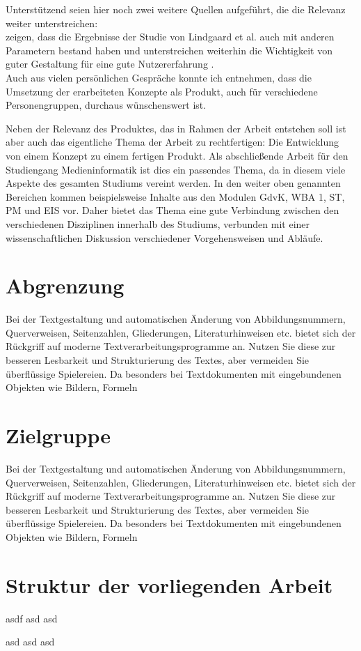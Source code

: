 Unterstützend seien hier noch zwei weitere Quellen aufgeführt, die die Relevanz weiter unterstreichen:\\
\cite{tractinsky2006evaluating} zeigen, dass die Ergebnisse der Studie von Lindgaard et al. auch mit anderen Parametern bestand haben und unterstreichen weiterhin die Wichtigkeit von guter Gestaltung für eine gute Nutzererfahrung \cite{tractinsky2000beautiful}.\\
Auch aus vielen persönlichen Gespräche konnte ich entnehmen, dass die Umsetzung der erarbeiteten Konzepte als Produkt, auch für verschiedene Personengruppen, durchaus wünschenswert ist.

Neben der Relevanz des Produktes, das in Rahmen der Arbeit entstehen soll ist aber auch das eigentliche Thema der Arbeit zu rechtfertigen: Die Entwicklung von einem Konzept zu einem fertigen Produkt.
Als abschließende Arbeit für den Studiengang Medieninformatik ist dies ein passendes Thema, da in diesem viele Aspekte des gesamten Studiums vereint werden. In den weiter oben genannten Bereichen kommen beispielsweise Inhalte aus den Modulen GdvK, WBA 1, ST,  PM und EIS vor. Daher bietet das Thema eine gute Verbindung zwischen den verschiedenen Disziplinen innerhalb des Studiums, verbunden mit einer wissenschaftlichen Diskussion verschiedener Vorgehensweisen und Abläufe.

\section{Abgrenzung}
Bei der Textgestaltung und automatischen Änderung von Abbildungsnummern, Querverweisen,
Seitenzahlen, Gliederungen, Literaturhinweisen etc. bietet sich der Rückgriff
auf moderne Textverarbeitungsprogramme an. Nutzen Sie diese zur besseren Lesbarkeit
und Strukturierung des Textes, aber vermeiden Sie überflüssige Spielereien. Da
besonders bei Textdokumenten mit eingebundenen Objekten wie Bildern, Formeln

\section{Zielgruppe}
Bei der Textgestaltung und automatischen Änderung von Abbildungsnummern, Querverweisen,
Seitenzahlen, Gliederungen, Literaturhinweisen etc. bietet sich der Rückgriff
auf moderne Textverarbeitungsprogramme an. Nutzen Sie diese zur besseren Lesbarkeit
und Strukturierung des Textes, aber vermeiden Sie überflüssige Spielereien. Da
besonders bei Textdokumenten mit eingebundenen Objekten wie Bildern, Formeln

\section{Struktur der vorliegenden Arbeit}
asdf
asd
asd

asd
asd
asd
